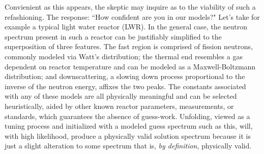 Convienient as this appears, the skeptic may inquire as to the viability of such a refashioning.
The response: ``How confident are you in our models?"
Let's take for example a typical light water reactor (LWR).
In the general case, the neutron spectrum present in such a reactor can be justifiably simplified to the superposition of three features.
The fast region is comprised of fission neutrons, commonly modeled via Watt's distribution; the thermal end resembles a gas dependent on reactor temperature and can be modeled as a Maxwell-Boltzmann distribution; and downscattering, a slowing down process proportional to the inverse of the neutron energy, affixes the two peaks.
The constants associated with any of these models are all physically meaningful and can be selected heuristically, aided by other known reactor parameters, measurements, or standards, which guarantees the absence of guess-work.
Unfolding, viewed as a tuning process and initialized with a modeled guess spectrum such as this, will, with high likelihood, produce a physically valid solution spectrum because it is just a slight alteration to some spectrum that is, {\it by definition}, physically valid.



